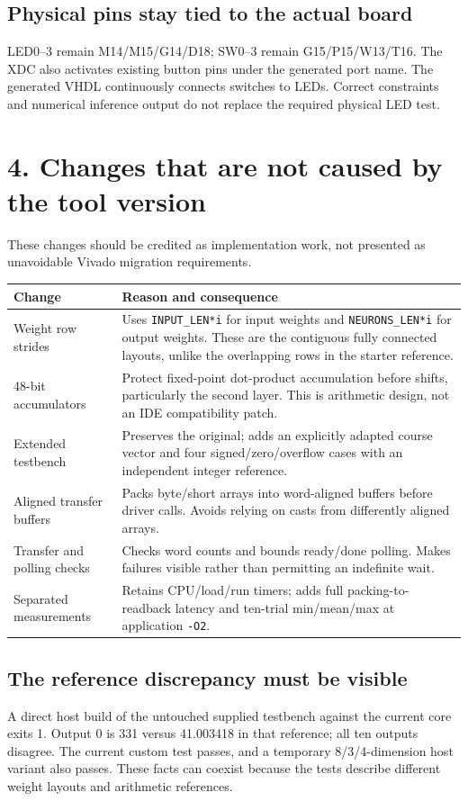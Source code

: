\documentclass[11pt,a4paper]{article}
\begin{document}
\subsection*{Physical pins stay tied to the actual board}
LED0--3 remain M14/M15/G14/D18; SW0--3 remain G15/P15/W13/T16.
The XDC also activates existing button pins under the generated port name.
The generated VHDL continuously connects switches to LEDs. Correct constraints
and numerical inference output do not replace the required physical LED test.

\newpage
\section*{4. Changes that are not caused by the tool version}
These changes should be credited as implementation work, not presented as
unavoidable Vivado migration requirements.

\begin{tabularx}{\linewidth}{P{3.2cm} Y}
\toprule Change & Reason and consequence \\
\midrule
Weight row strides & Uses \texttt{INPUT\_LEN*i} for input weights and \texttt{NEURONS\_LEN*i} for output weights. These are the contiguous fully connected layouts, unlike the overlapping rows in the starter reference. \\
48-bit accumulators & Protect fixed-point dot-product accumulation before shifts, particularly the second layer. This is arithmetic design, not an IDE compatibility patch. \\
Extended testbench & Preserves the original; adds an explicitly adapted course vector and four signed/zero/overflow cases with an independent integer reference. \\
Aligned transfer buffers & Packs byte/short arrays into word-aligned buffers before driver calls. Avoids relying on casts from differently aligned arrays. \\
Transfer and polling checks & Checks word counts and bounds ready/done polling. Makes failures visible rather than permitting an indefinite wait. \\
Separated measurements & Retains CPU/load/run timers; adds full packing-to-readback latency and ten-trial min/mean/max at application \texttt{-O2}. \\
\bottomrule
\end{tabularx}

\subsection*{The reference discrepancy must be visible}
A direct host build of the untouched supplied testbench against the current
core exits 1. Output 0 is 331 versus 41.003418 in that reference; all ten outputs
disagree. The current custom test passes, and a temporary 8/3/4-dimension host
variant also passes. These facts can coexist because the tests describe
different weight layouts and arithmetic references.
\end{document}
